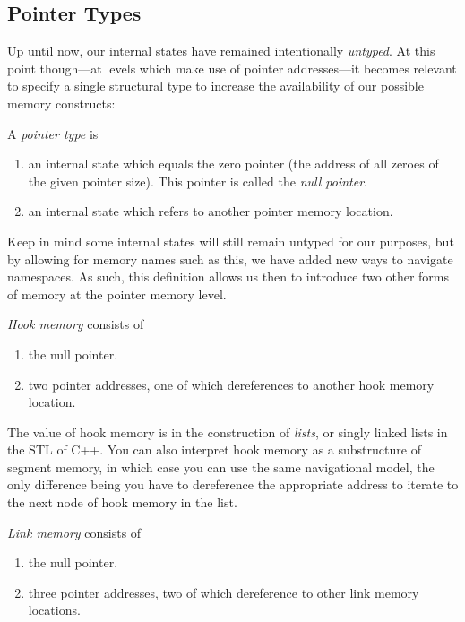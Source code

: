 \documentclass[twoside]{article}
\newenvironment{definition}[1][Definition]{\begin{trivlist}
\item[\hskip \labelsep {\bfseries #1:}]}{\end{trivlist}}
\begin{document}
\subsection*{Pointer Types}

Up until now, our internal states have remained intentionally \emph{untyped}. At this point though---at levels which
make use of pointer addresses---it becomes relevant to specify a single structural type to increase the availability
of our possible memory constructs:
\begin{definition}[Pointer Type]
A \emph{pointer type} is
\begin{enumerate}
\item an internal state which equals the zero pointer (the address of all zeroes of the given pointer size).
      This pointer is called the \emph{null pointer}.
\item an internal state which refers to another pointer memory location.
\end{enumerate}
\end{definition}
Keep in mind some internal states will still remain untyped for our purposes, but by allowing for memory names such
as this, we have added new ways to navigate namespaces. As such, this definition allows us then to introduce two other
forms of memory at the pointer memory level.

\begin{definition}[Hook Memory]
\emph{Hook memory} consists of
\begin{enumerate}
\item the null pointer.
\item two pointer addresses, one of which dereferences to another hook memory location.
\end{enumerate}
\end{definition}

The value of hook memory is in the construction of \emph{lists}, or singly linked lists in the STL of C++.
You can also interpret hook memory as a substructure of segment memory, in which case you can use the same navigational
model, the only difference being you have to dereference the appropriate address to iterate to the next node of hook memory
in the list.

\begin{definition}[Link Memory]
\emph{Link memory} consists of
\begin{enumerate}
\item the null pointer.
\item three pointer addresses, two of which dereference to other link memory locations.
\end{enumerate}
\end{definition}
\end{document}
